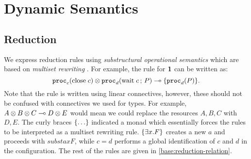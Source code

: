 
\section{Dynamic Semantics}
\label{base:semantics}

\subsection{Reduction}

We express reduction rules using \emph{substructural operational semantics} \cite{Simmons12} which are based on \emph{multiset rewriting} \cite{CervesatoS09}. For example, the rule for $\mathbf{1}$ can be written as:
$$ \mathtt{proc}_{c}(\mathrm{close}\;c) \otimes \mathtt{proc}_{d}(\mathrm{wait}\;c \,;\, P) \multimap \lbrace\mathtt{proc}_{d}(P)\rbrace. $$
Note that the rule is written using linear connectives, however, these should not be confused with connectives we used for types. For example, $A \otimes B \otimes C \multimap D \otimes E$ would mean we could replace the resources $A, B, C$ with $D, E$. The curly braces $\lbrace\ldots\rbrace$ indicated a monad which essentially forces the rules to be interpreted as a multiset rewriting rule. $\lbrace\exists x. F\rbrace$ creates a new $a$ and proceeds with $subst a x F$, while $c = d$ performs a global identification of $c$ and $d$ in the configuration. The rest of the rules are given in \cref{base:reduction-relation}.

